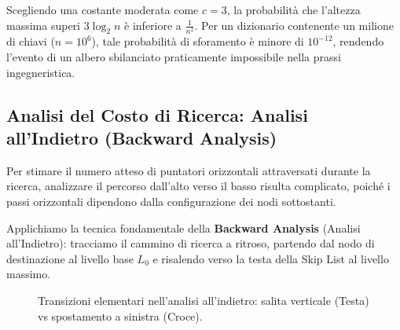 \begin{example}
Scegliendo una costante moderata come $c = 3$, la probabilità che l'altezza massima superi $3 \log_2 n$ è inferiore a $\frac{1}{n^2}$. Per un dizionario contenente un milione di chiavi ($n = 10^6$), tale probabilità di sforamento è minore di $10^{-12}$, rendendo l'evento di un albero sbilanciato praticamente impossibile nella prassi ingegneristica.
\end{example}

\subsection{Analisi del Costo di Ricerca: Analisi all'Indietro (Backward Analysis)}
Per stimare il numero atteso di puntatori orizzontali attraversati durante la ricerca, analizzare il percorso dall'alto verso il basso risulta complicato, poiché i passi orizzontali dipendono dalla configurazione dei nodi sottostanti.

Applichiamo la tecnica fondamentale della \textbf{Backward Analysis} (Analisi all'Indietro): tracciamo il cammino di ricerca a ritroso, partendo dal nodo di destinazione al livello base $L_0$ e risalendo verso la testa della Skip List al livello massimo.

\begin{figure}[htbp]
\centering
{}
\caption{Transizioni elementari nell'analisi all'indietro: salita verticale (Testa) vs spostamento a sinistra (Croce).}
\label{fig:backward-analysis-transitions}
\end{figure}


